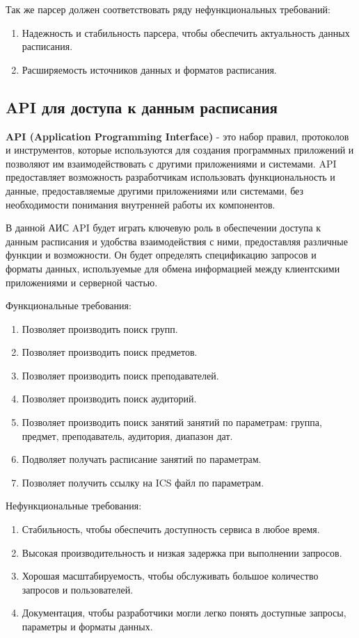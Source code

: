 Так же парсер должен соответствовать ряду нефункциональных требований:
\begin{enumerate}
  \item Надежность и стабильность парсера, чтобы обеспечить актуальность данных расписания.
  \item Расширяемость источников данных и форматов расписания.
\end{enumerate}
  
\subsection{API для доступа к данным расписания}
\textbf{API (Application Programming Interface)} - это набор правил, протоколов и инструментов, 
которые используются для создания программных приложений и позволяют им взаимодействовать с другими приложениями и системами. 
API предоставляет возможность разработчикам использовать функциональность и данные, 
предоставляемые другими приложениями или системами, 
без необходимости понимания внутренней работы их компонентов.

В данной АИС API будет играть ключевую роль в обеспечении доступа к данным расписания 
и удобства взаимодействия с ними, предоставляя различные функции и возможности. 
Он будет определять спецификацию запросов и форматы данных, 
используемые для обмена информацией между клиентскими приложениями и серверной частью.

Функциональные требования:
\begin{enumerate}
  \item Позволяет производить поиск групп.
  \item Позволяет производить поиск предметов.
  \item Позволяет производить поиск преподавателей.
  \item Позволяет производить поиск аудиторий.
  \item Позволяет производить поиск занятий занятий по параметрам: 
  группа, предмет, преподаватель, аудитория, диапазон дат.
  \item Подволяет получать расписание занятий по параметрам.
  \item Позволяет получить ссылку на ICS файл по параметрам.
\end{enumerate}

Нефункциональные требования:
\begin{enumerate}
  \item Стабильность, чтобы обеспечить доступность сервиса в любое время.
  \item Высокая производительность и низкая задержка при выполнении запросов.
  \item Хорошая масштабируемость, чтобы обслуживать большое количество запросов и пользователей.
  \item Документация, чтобы разработчики могли легко понять доступные запросы, 
  параметры и форматы данных.
\end{enumerate}

